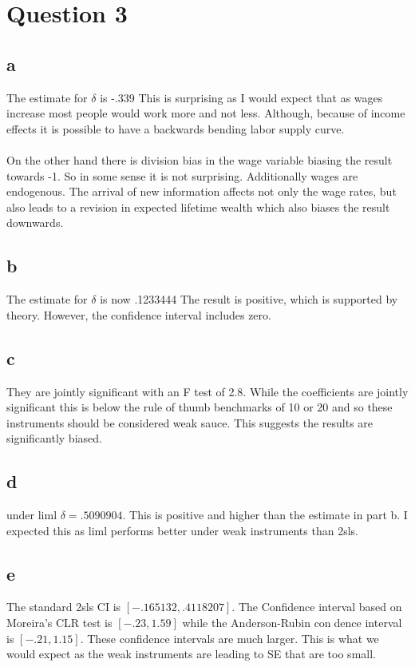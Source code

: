 \documentclass[11pt]{article}
\begin{document}
\pagebreak

\section{Question 3}
\subsection{a}
The estimate for $\delta$ is -.339 This is surprising as I would expect that as wages increase most people would work more and not less. Although, because of income effects it is possible to have a backwards bending labor supply curve. 
\\ \\ 

On the other hand there is division bias in the wage variable biasing the result towards -1. So in some sense it is not surprising. Additionally wages are endogenous. The arrival of new information affects not only the wage rates, but also leads to a revision in expected lifetime wealth which also biases the result downwards. 

\subsection{b}
The estimate for $\delta$ is now .1233444 The result is positive, which is supported by theory. However, the confidence interval includes zero. 

\subsection{c}
 They are jointly significant with an F test of  2.8. While the coefficients are jointly significant this is below the rule of thumb benchmarks of 10 or 20 and so these instruments should be considered weak sauce. This suggests the results are significantly biased. 

 
 \subsection{d}
 under liml $\delta = .5090904  $. This is positive and higher than the estimate in part b. I expected this as liml performs better under weak instruments than 2sls.
 
 \subsection{e}
 The standard 2sls CI is $ [-.165132,    .4118207]$. The Confidence interval based on Moreira's CLR test is $[    -.23,    1.59]$ while the Anderson-Rubin condence interval is $ [    -.21,    1.15] $. These confidence intervals are much larger. This is what we would expect as the weak instruments are leading to SE that are too small. 
  
\end{document}
